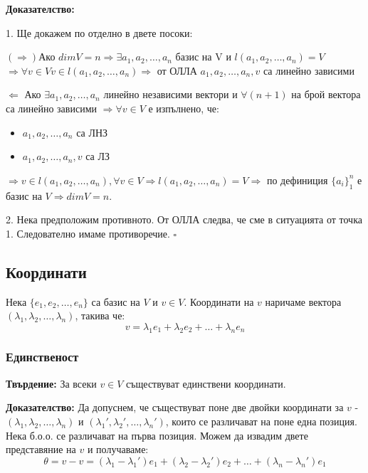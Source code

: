 \documentclass[fleqn,12pt]{article}
\begin{document}
\begin{flushleft}
\vspace{5mm}

\textbf{Доказателство:}

1. Ще докажем по отделно в двете посоки:
    
\vspace{5mm}

$(\Rightarrow) $Ако $dimV = n \Rightarrow \exists a_1, a_2, \dots, a_n $ базис на V и $l(a_1, a_2, \dots, a_n) = V$ $\Rightarrow \forall v \in V v \in l(a_1, a_2, \dots, a_n) \Rightarrow $ от ОЛЛА $ a_1, a_2, \dots, a_n, v $ са линейно зависими 

\vspace{5mm}

$\Leftarrow $ Ако $ \exists a_1, a_2, \dots, a_n $ линейно независими вектори и $ \forall (n + 1) $ на брой вектора са линейно зависими $\Rightarrow \forall v \in V $ е изпълнено, че:
\begin{itemize}
    \item $a_1, a_2, \dots, a_n $ са ЛНЗ
    \item $a_1, a_2, \dots, a_n, v $ са  ЛЗ
\end{itemize}
    
$\Rightarrow v \in l(a_1, a_2, \dots, a_n), \forall v \in V \Rightarrow l(a_1, a_2, \dots, a_n) = V \Rightarrow $ по дефиниция $ \{a_i\}_1^n $ е базис на $V \Rightarrow dimV = n$. 

\vspace{5mm}

2. Нека предположим противното. От ОЛЛА следва, че сме в ситуацията от точка 1. Следователно имаме противоречие. $\square$

\subsection{Координати}
Нека $\{e_1, e_2, \dots, e_n\}$ са базис на $V$ и $v \in V$. Координати на $v$ наричаме вектора $(\lambda_1, \lambda_2, \dots, \lambda_n)$, такива че:
\[ v = \lambda_1 e_1 + \lambda_2 e_2 + \dots + \lambda_n e_n \]

\subsubsection{Единственост}
\textbf{Твърдение: } За всеки $v \in V$ съществуват единствени координати.

\vspace{5mm}
\textbf{Доказателство: } Да допуснем, че съществуват поне две двойки координати за $v$ - $(\lambda_1, \lambda_2, \dots, \lambda_n)$ и 
$(\lambda_1', \lambda_2', \dots, \lambda_n')$, които се различават на поне една позиция. Нека б.о.о. се различават на първа позиция. 
Можем да извадим двете представяние на $v$ и получаваме:
\[ \theta = v - v = (\lambda_1 - \lambda_1') e_1 + (\lambda_2 - \lambda_2') e_2 + \dots + (\lambda_n - \lambda_n') e_1\]


\end{flushleft}
\end{document}
